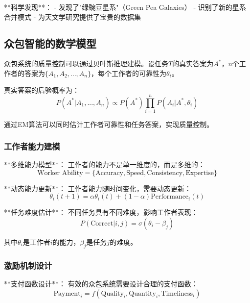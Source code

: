 **科学发现**：
- 发现了"绿豌豆星系"（Green Pea Galaxies）
- 识别了新的星系合并模式
- 为天文学研究提供了宝贵的数据集

\subsection{众包智能的数学模型}

众包系统的质量控制可以通过贝叶斯推理建模。设任务$T$的真实答案为$A^*$，$n$个工作者的答案为$\{A_1, A_2, ..., A_n\}$，每个工作者的可靠性为$\theta_i$。

真实答案的后验概率为：
\begin{equation}
P(A^*|A_1, ..., A_n) \propto P(A^*) \prod_{i=1}^n P(A_i|A^*, \theta_i)
\end{equation}

通过EM算法可以同时估计工作者可靠性和任务答案，实现质量控制。

\subsubsection{工作者能力建模} %

**多维能力模型**：
工作者的能力不是单一维度的，而是多维的：
\begin{equation}
\text{Worker Ability} = \{\text{Accuracy}, \text{Speed}, \text{Consistency}, \text{Expertise}\}
\end{equation}

**动态能力更新**：
工作者能力随时间变化，需要动态更新：
\begin{equation}
\theta_i(t+1) = \alpha \theta_i(t) + (1-\alpha) \text{Performance}_i(t)
\end{equation}

**任务难度估计**：
不同任务具有不同难度，影响工作者表现：
\begin{equation}
P(\text{Correct}|i, j) = \sigma(\theta_i - \beta_j)
\end{equation}

其中$\theta_i$是工作者$i$的能力，$\beta_j$是任务$j$的难度。

\subsubsection{激励机制设计} %

**支付函数设计**：
有效的众包系统需要设计合理的支付函数：
\begin{equation}
\text{Payment}_i = f(\text{Quality}_i, \text{Quantity}_i, \text{Timeliness}_i)
\end{equation}

